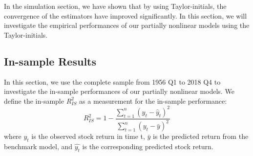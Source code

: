 \documentclass[a4paper,12pt,times,numbered,print,index]{report}
\numberwithin{equation}{section}
\begin{document}
	In the simulation section, we have shown that by using Taylor-initials, the convergence of the estimators have improved significantly. In this section, we will investigate the empirical performances of our partially nonlinear models using the Taylor-initials.
	
	
	
	
	
	
	
	
	\subsection{In-sample Results}
	In this section, we use the complete sample from 1956 Q1 to 2018 Q4 to investigate the in-sample performances of our partially nonlinear models. We define the in-sample $R^2_{IS}$ as a measurement for the in-sample performance:
	\begin{equation}
		R_{IS}^{2}=1-\frac{\sum_{t=1}^{n}\left(y_{t}-\widehat{y}_{t}\right)^{2}}{\sum_{t=1}^{n}\left(y_{t}-\bar{y}\right)^{2}}
	\end{equation}
	where $y_t$ is the observed stock return in time t, $\bar{y}$ is the predicted return from the benchmark model, and $\hat{y_{t}}$ is the corresponding predicted stock return. 
	
\end{document}
